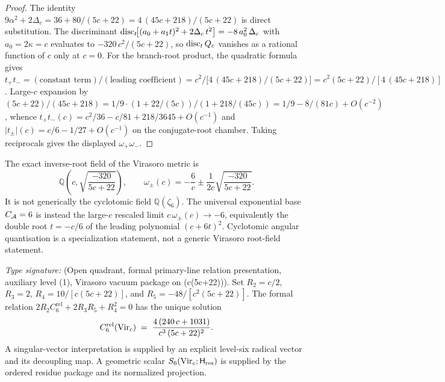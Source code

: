 \begin{proof}
The identity
$9\alpha^{2} + 2\Delta_c = 36 + 80/(5c+22) = 4\,(45 c + 218)/(5c+22)$
is direct substitution. The discriminant
$\operatorname{disc}_t\!\bigl[(a_0 + a_1 t)^{2} + 2 \Delta_c\,t^{2}\bigr]
 = -8\,a_0^{2}\,\Delta_c$
with $a_0 = 2\kappa = c$ evaluates to $-320\,c^{2}/(5c+22)$, so
$\operatorname{disc}_t Q_c$ vanishes as a rational function of $c$ only at $c = 0$.
For the branch-root product, the quadratic formula gives
$t_+t_- = (\text{constant term})/(\text{leading coefficient})
 = c^{2}\big/\bigl[4\,(45 c + 218)/(5c+22)\bigr]
 = c^{2}(5c+22)/[4\,(45 c + 218)]$.
Large-$c$ expansion by $(5c+22)/(45c+218)
 = 1/9 \cdot (1 + 22/(5c))/(1 + 218/(45c))
 = 1/9 - 8/(81 c) + O(c^{-2})$, whence
$t_+t_-(c) = c^{2}/36 - c/81 + 218/3645 + O(c^{-1})$
and $\lvert t_\pm\rvert(c) = c/6 - 1/27 + O(c^{-1})$ on the
conjugate-root chamber. Taking reciprocals gives the displayed
$\omega_+\omega_-$.
\end{proof}

\begin{remark}
\label{rem:cyclotomic-singularities}
The exact inverse-root field of the Virasoro metric is
\[
\mathbb Q\!\left(c,\sqrt{\frac{-320}{5c+22}}\right),
\qquad
\omega_\pm(c)=-\frac{6}{c}\pm
\frac{1}{2c}\sqrt{\frac{-320}{5c+22}}.
\]
It is not generically the cyclotomic field $\mathbb Q(\zeta_6)$.
The universal exponential base $C_{\mathcal{A}}=6$ is instead the large-$c$
rescaled limit $c\,\omega_\pm(c)\to -6$, equivalently the double
root $t=-c/6$ of the leading polynomial $(c+6t)^2$.
Cyclotomic angular quantisation is a specialization statement, not a
generic Virasoro root-field statement.
\end{remark}

\begin{theorem}
\label{thm:S6-Vir-closed}
\ClaimStatusProvedHere
\emph{Type signature:}
\textup{(Open quadrant, formal primary-line relation presentation,
auxiliary level (1), Virasoro vacuum package on
(c(5c+22))).}
Set $R_2 = c/2$, $R_3 = 2$,
$R_4 = 10/[c(5c+22)]$, and $R_5 = -48/[c^{2}(5c+22)]$.
The formal relation
$2R_2C_6^{\mathrm{rel}}+2R_3R_5+R_4^2=0$ has the unique solution
\begin{equation}
\label{eq:S6-closed}
C_6^{\mathrm{rel}}(\mathrm{Vir}_c) \;=\;
\frac{4\,(240\, c + 1031)}{c^{3}\,(5c+22)^{2}}.
\end{equation}
A singular-vector interpretation is supplied by an explicit
level-six radical vector and its decoupling map.  A geometric scalar
$S_6(\mathrm{Vir}_c;\mathsf H_{\mathrm{res}})$ is supplied by the ordered
residue package and its normalized projection.
\end{theorem}

